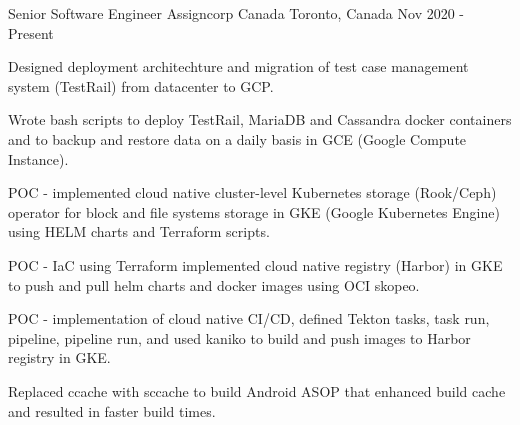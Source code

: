 

\begin{cventries}

  \cventry
    {Senior Software Engineer} %
    {Assigncorp Canada} %
    {Toronto, Canada} %
    {Nov 2020 - Present} %
    {
      \begin{cvitems} %
        \item {Designed deployment architechture and migration of test case management system (TestRail) from datacenter to GCP.}
        \item {Wrote bash scripts to deploy TestRail, MariaDB and Cassandra docker containers and to backup and restore data on a daily basis in GCE (Google Compute Instance).}
        \item {POC - implemented cloud native cluster-level Kubernetes storage (Rook/Ceph) operator for block and file systems storage in GKE (Google Kubernetes Engine) using HELM charts and Terraform scripts.}
        \item {POC - IaC using Terraform implemented cloud native registry (Harbor) in GKE to push and pull helm charts and docker images using OCI skopeo.}
        \item {POC - implementation of cloud native CI/CD, defined Tekton tasks, task run, pipeline, pipeline run, and used kaniko to build and push images to Harbor registry in GKE.}
        \item {Replaced ccache with sccache to build Android ASOP that enhanced build cache and resulted in faster build times.}
      \end{cvitems}
    }


\end{cventries}
